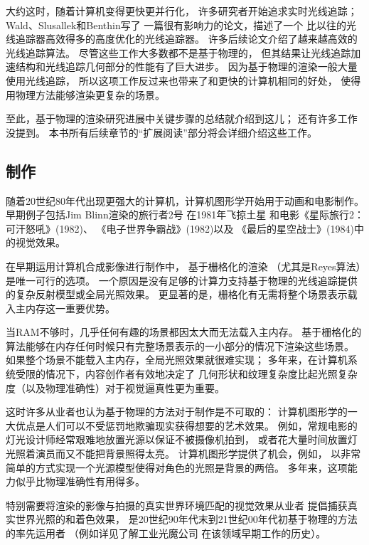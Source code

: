 大约这时，随着计算机变得更快更并行化，
许多研究者开始追求实时光线追踪；
Wald、Slusallek和Benthin\parencite*{10.1007/978-3-7091-6242-2_26}写了
一篇很有影响力的论文，描述了一个
比以往的光线追踪器高效得多的高度优化的光线追踪器。
许多后续论文介绍了越来越高效的光线追踪算法。
尽管这些工作大多数都不是基于物理的，
但其结果让光线追踪加速结构和光线追踪几何部分的性能有了巨大进步。
因为基于物理的渲染一般大量使用光线追踪，
所以这项工作反过来也带来了和更快的计算机相同的好处，
使得用物理方法能够渲染更复杂的场景。

至此，基于物理的渲染研究进展中关键步骤的总结就介绍到这儿；
还有许多工作没提到。
本书所有后续章节的“扩展阅读”部分将会详细介绍这些工作。

\subsection{制作}\label{sub:制作}
随着20世纪80年代出现更强大的计算机，计算机图形学开始用于动画和电影制作。
早期例子包括Jim Blinn渲染的旅行者2号
在1981年飞掠土星
和电影《星际旅行2：可汗怒吼》(1982)、
《电子世界争霸战》(1982)以及
《最后的星空战士》(1984)中的视觉效果。

在早期运用计算机合成影像进行制作中，
基于栅格化的渲染
（尤其是Reyes算法\citep{10.1145/37401.37414}）是唯一可行的选项。
一个原因是没有足够的计算力支持基于物理的光线追踪提供的复杂反射模型或全局光照效果。
更显著的是，栅格化有无需将整个场景表示载入主内存这一重要优势。

当RAM不够时，几乎任何有趣的场景都因太大而无法载入主内存。
基于栅格化的算法能够在内存任何时候只有完整场景表示的一小部分的情况下渲染这些场景。
如果整个场景不能载入主内存，全局光照效果就很难实现；
多年来，在计算机系统受限的情况下，内容创作者有效地决定了
几何形状和纹理复杂度比起光照复杂度（以及物理准确性）对于视觉逼真性更为重要。

这时许多从业者也认为基于物理的方法对于制作是不可取的：
计算机图形学的一大优点是人们可以不受惩罚地欺骗现实获得想要的艺术效果。
例如，常规电影的灯光设计师经常艰难地放置光源以保证不被摄像机拍到，
或者花大量时间放置灯光照着演员而又不能把背景照得太亮。
计算机图形学提供了机会，例如，
以非常简单的方式实现一个光源模型使得对角色的光照是背景的两倍。
多年来，这项能力似乎比物理准确性有用得多。

特别需要将渲染的影像与拍摄的真实世界环境匹配的视觉效果从业者
提倡捕获真实世界光照的和着色效果，
是20世纪90年代末到21世纪00年代初基于物理的方法的率先运用者
（例如详见\citet{snow2010terminators}了解工业光魔公司
在该领域早期工作的历史）。

